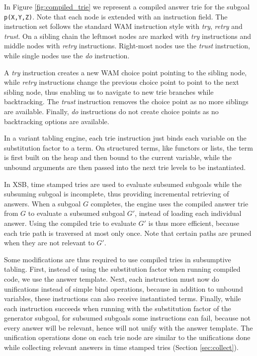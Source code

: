 In Figure \ref{fig:compiled_trie} we represent a compiled answer trie for the subgoal
\texttt{p(X,Y,Z)}. Note that each node is extended with an instruction field.
The instruction set follows the standard WAM instruction style with \textit{try},
\textit{retry} and \textit{trust}.
On a sibling chain the leftmost nodes are marked with \textit{try} instructions and middle
nodes with \textit{retry} instructions. Right-most nodes use the \textit{trust} instruction,
while single nodes use the \textit{do} instruction.

A \textit{try} instruction creates a new WAM choice point pointing to the sibling node,
while \textit{retry} instructions change the previous choice point to point to the next sibling node,
thus enabling us to navigate to new trie branches while backtracking. The \textit{trust}
instruction removes the choice point as no more siblings are available. Finally, \textit{do}
instructions do not create choice points as no backtracking options are available.

In a variant tabling engine, each trie instruction just binds each variable on the substitution factor to a term.
On structured terms, like functors or lists, the term is first built on the heap and then
bound to the current variable, while the unbound arguments are then passed into the next trie levels
to be instantiated.

In XSB, time stamped tries are used to evaluate subsumed subgoals while the subsuming subgoal
is incomplete, thus providing incremental retrieving of answers.
When a subgoal $G$ completes, the engine uses the compiled answer trie from $G$
to evaluate a subsumed subgoal $G'$, instead of loading each individual answer.
Using the compiled trie to evaluate $G'$ is thus more efficient, because
each trie path is traversed at most only once. Note that certain paths are pruned when they
are not relevant to $G'$.

Some modifications are thus required to use compiled tries in subsumptive tabling. First,
instead of using the substitution factor when running compiled code, we use the answer template.
Next, each instruction must now do unifications instead of simple bind operations,
because in addition to unbound variables, these instructions can also receive instantiated terms.
Finally, while each instruction succeeds when running with the substitution factor of the generator
subgoal, for subsumed subgoals some instructions can fail, because not every answer will be relevant,
hence will not unify with the answer template. The unification operations done on each trie node
are similar to the unifications done while collecting relevant answers in time stamped tries
(Section \ref{sec:collect}).

